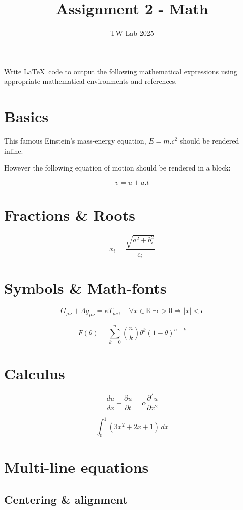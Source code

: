 \documentclass[12pt,a4paper]{article}
\begin{document}
	
	\title{Assignment 2 - Math}
	\author{TW Lab 2025}
	\date{}
	
	\maketitle
	
	Write \LaTeX\ code to output the following mathematical expressions using appropriate mathematical environments and references.
	
	\section{Basics}
	
	This famous Einstein's mass-energy equation,
	$E=m.c^2$ should be rendered inline.
	
	However the following equation of motion should be rendered in a block:
	
	\[
	v=u+a.t
	\]
	
	\section{Fractions \& Roots}
	
	\[
	x_i=\frac{\sqrt{a^2+b_i^2}}{c_i}
	\]
	
	\section{Symbols \& Math-fonts}
	
	\[
	G_{\mu\nu}+\Lambda g_{\mu\nu}=\kappa T_{\mu\nu},
	\quad
	\forall x\in\mathbb{R}\ \exists\epsilon>0
	\Rightarrow |x|<\epsilon
	\]
	
	\[
	F(\theta)=\sum_{k=0}^{n}
	\binom{n}{k}\theta^k(1-\theta)^{n-k}
	\]
	
	\section{Calculus}
	
	\[
	\frac{du}{dx}+\frac{\partial u}{\partial t}
	=
	\alpha\frac{\partial^2u}{\partial x^2}
	\]
	
	\[
	\int_0^1(3x^2+2x+1)\,dx
	\]
	
	\section{Multi-line equations}
	
	\subsection{Centering \& alignment}
	
\end{document}
